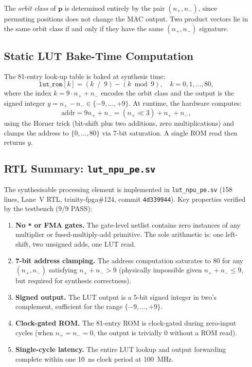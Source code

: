The \emph{orbit class} of $\mathbf{p}$ is determined entirely by the pair
$(n_{+}, n_{-})$, since permuting positions does not change the MAC output.
Two product vectors lie in the same orbit class if and only if they have the
same $(n_{+}, n_{-})$ signature.

\subsection{Static LUT Bake-Time Computation}

The 81-entry look-up table is baked at synthesis time:
\[
  \texttt{lut\_rom}[k] = (k \;\mathbin{/}\; 9) - (k \bmod 9), \quad k = 0, 1, \ldots, 80,
\]
where the index $k = 9 \cdot n_{+} + n_{-}$ encodes the orbit class and the
output is the signed integer $y = n_{+} - n_{-} \in \{-9, \ldots, +9\}$.
At runtime, the hardware computes:
\[
  \mathrm{addr} = 9 n_{+} + n_{-} = (n_{+} \ll 3) + n_{+} + n_{-},
\]
using the Horner trick (bit-shift plus two additions, zero multiplications)
and clamps the address to $\{0,\ldots,80\}$ via 7-bit saturation.  A single
ROM read then returns $y$.

\subsection{RTL Summary: \texttt{lut\_npu\_pe.sv}}

The synthesisable processing element is implemented in
\texttt{lut\_npu\_pe.sv} (158 lines, Lane~V RTL, trinity-fpga\#124,
commit \texttt{4d339944}).  Key properties verified by the testbench
(9/9 PASS):

\begin{enumerate}
  \item \textbf{No \texttt{*} or FMA gates.}  The gate-level netlist contains
    zero instances of any multiplier or fused-multiply-add primitive.
    The sole arithmetic is: one left-shift, two unsigned adds, one LUT read.
  \item \textbf{7-bit address clamping.}  The address computation saturates to
    80 for any $(n_{+}, n_{-})$ satisfying $n_{+} + n_{-} > 9$ (physically
    impossible given $n_{+} + n_{-} \leq 9$, but required for synthesis
    correctness).
  \item \textbf{Signed output.}  The LUT output is a 5-bit signed integer in
    two's complement, sufficient for the range $\{-9,\ldots,+9\}$.
  \item \textbf{Clock-gated ROM.}  The 81-entry ROM is clock-gated during
    zero-input cycles (when $n_{+} = n_{-} = 0$, the output is trivially 0
    without a ROM read).
  \item \textbf{Single-cycle latency.}  The entire LUT lookup and output
    forwarding complete within one 10~ns clock period at 100~MHz.
\end{enumerate}

